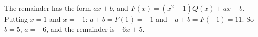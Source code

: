 The remainder has the form $ax+b$, and $F(x)=(x^2-1)Q(x)+ax+b$. Putting $x=1$ and $x=-1$: $a+b=F(1)=-1$ and $-a+b=F(-1)=11$. So $b=5$, $a=-6$, and the remainder is $\boxed{-6x+5}$.
